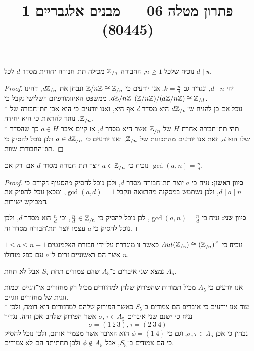 
\title{פתרון מטלה 06 --- מבנים אלגבריים 1 (80445)}


\maketitle
\maketitleprint{}

\Question{}
\Subquestion{}
נוכיח שלכל $n \ge 1$, החבורה $\mathbb{Z}_{/n}$ מכילה תת־חבורה יחודית מסדר $d$ לכל $d \mid n$.
\begin{proof}
	יהי $d \mid n$, ונגדיר גם $k = \frac{n}{d}$.
	אנו יודעים כי $\mathbb{Z} / n\mathbb{Z} \cong \mathbb{Z}_{/n}$ ונבחן את $d\mathbb{Z}_{/n}$, דהינו $d\mathbb{Z}/n\mathbb{Z}$, 
	ממשפט האיזומורפיזם השלישי נקבל כי $(\mathbb{Z} / n\mathbb{Z}) / (d\mathbb{Z} / n\mathbb{Z}) \cong \mathbb{Z}_{/d}$. \\*
	נוכל אם כן להניח ש־$d\mathbb{Z}_{/n}$ היא מסדר $d$ אף היא, ואנו יודעים כי היא אכן תת־חבורה של $\mathbb{Z}_{/n}$, נותר להראות כי היא יחידה. \\*
	תהי תת־חבורה אחרת $H$ של $\mathbb{Z}_{/n}$ אשר היא מסדר $d$, אז קיים איבר $a \in H$ כך שהסדר שלו הוא $d$, זאת אנו יודעים מהתכונות של $\mathbb{Z}_{/n}$, ואנו יודעים כי $a \in d\mathbb{Z}_{/n}$ ולכן נוכל להסיק כי תת־החבורות שוות.
\end{proof}

\Subquestion{}
נוכיח כי $a \in \mathbb{Z}_{/n}$ יוצר תת־חבורה מסדר $d$ אם ורק אם $\gcd(a, n) = \frac{n}{d}$.
\begin{proof}
	\textbf{כיוון ראשון:}
	נניח כי $a$ יוצר תת־חבורה מסדר $d$, ולכן נוכל להסיק מהסעיף הקודם כי $d \mid a \mid n$, ולכן נשתמש במסקנה מהרצאה ונקבל $\gcd(a, d) = 1$, ומכאן נוכל להסיק את המבוקש ישירות.

	\textbf{כיוון שני:}
	נניח כי $\gcd(a, n) = \frac{n}{d}$, לכן נוכל להסיק כי $\frac{n}{d} \in \mathbb{Z}_{/n}$, וכי $\frac{n}{d}$ הוא מסדר $d$, ולכן נוכל להסיק כי $a$ עצמו יוצר תת־חבורה מסדר זה.
\end{proof}

\Subquestion{}
נוכיח כי $Aut(\mathbb{Z}_{/n}) \cong {(\mathbb{Z}_{/n})}^\times$ כאשר זו מוגדרת על־ידי חבורת האלמנטים $1 \le a \le n - 1$ אשר הם ראשוניים זרים ל־$n$ עם כפל מודולו $n$.

\Question{}
נמצא שני איברים ב־$A_5$ שהם צמודים תחת $S_5$ אבל לא תחת $A_5$.

אנו יודעים כי $A_5$ מכיל תמורות שהפירוק שלהן למחזורים מכיל רק מחזורים אי־זוגיים וכמות זוגית של מחזורים זוגיים. \\*
עוד אנו יודעים כי איברים הם צמודים ב־$S_5$ כאשר הפירוק שלהם למחזורים הוא דומה, ולכן נניח כי ישנם שני איברים $\sigma, \tau \in A_5$ אשר הפירוק שלהם אכן זהה.
נגדיר
\[
	\sigma = (1\ 2\ 3), \tau = (2\ 3\ 4)
\]
נבחין כי אכן $\sigma, \tau \in A_5$, וגם כי $\phi = (1\ 4)$ הוא האיבר אשר מצמיד אותם, ולכן נוכל להסיק כי הם צמודים ב־$S_5$, אבל $\phi \notin A_5$ ולכן תחתיתה הם לא צמודים.

